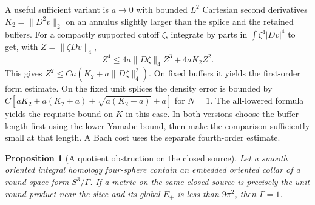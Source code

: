 \documentclass[11pt]{article}
\numberwithin{equation}{section}
\newtheorem{proposition}[theorem]{Proposition}
\theoremstyle{definition}
\theoremstyle{remark}
\begin{document}
A useful sufficient variant is \(a\to0\) with bounded
\(L^2\) Cartesian second derivatives \(K_2=\|D^2v\|_2\) on
an annulus slightly larger than the splice and the retained
buffers. For a compactly supported cutoff \(\zeta\), integrate by
parts in \(\int\zeta^4|Dv|^4\) to get, with
\(Z=\|\zeta Dv\|_4\),
\[
 Z^4\le 4a\|D\zeta\|_4 Z^3+4aK_2 Z^2 .
\]
This gives \(Z^2\le C a(K_2+a\|D\zeta\|_4^2)\). On fixed
buffers it yields the first-order form estimate. On the fixed
unit splices the density error is bounded by
\(C[aK_2+a(K_2+a)+\sqrt{a(K_2+a)}+a]\) for \(N=1\).
The all-lowered formula yields the requisite bound on \(K\) in
this case. In both versions choose the buffer length first using
the lower Yamabe bound, then make the comparison sufficiently
small at that length. A Bach cost uses the separate fourth-order
estimate.

\begin{proposition}[A quotient obstruction on the closed source]\label{prop:link}
Let a smooth oriented integral homology four-sphere contain an
embedded oriented collar of a round space form \(S^3/\Gamma\).
If a metric on the same closed source is precisely the unit round
product near the slice and its global \(E_+\) is less than
\(9\pi^2\), then \(\Gamma=1\).
\end{proposition}
\end{document}
